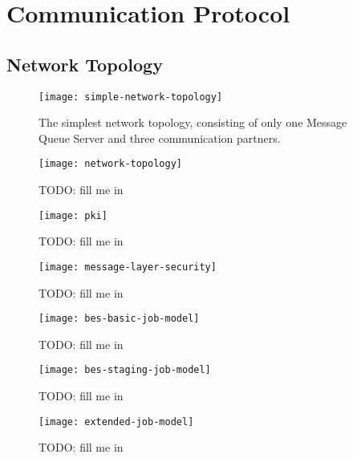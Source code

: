 \chapter{Communication Protocol}
\label{cha:comm-prot}

\section{Network Topology}
\label{sec:network-topology}

\begin{figure}[h]
  \begin{center}
    \texttt{[image: simple-network-topology]}
  \end{center}
  \caption[Network  Topology   (simple)]{The  simplest  network  topology,
    consisting of  only one Message  Queue Server and  three communication
    partners.}
  \label{fig:simple-net-top}
\end{figure}

\begin{figure}[H!]
  \begin{center}
    \texttt{[image: network-topology]}
  \end{center}
  \caption[Network  Topology]{TODO: fill me in}
  \label{fig:net-top}
\end{figure}

\begin{figure}[h]
  \begin{center}
    \texttt{[image: pki]}
  \end{center}
  \caption[Public Key Infrastructure]{TODO: fill me in}
  \label{fig:net-pki}
\end{figure}

\begin{figure}[h]
  \begin{center}
    \texttt{[image: message-layer-security]}
  \end{center}
  \caption[Message Layer Security]{TODO: fill me in}
  \label{fig:net-mls}
\end{figure}

\begin{figure}[h]
  \begin{center}
    \texttt{[image: bes-basic-job-model]}
  \end{center}
  \caption[BES Basic State Model]{TODO: fill me in}
  \label{fig:bes-basic}
\end{figure}

\begin{figure}[h]
  \begin{center}
    \texttt{[image: bes-staging-job-model]}
  \end{center}
  \caption[BES State Model Staging Extension]{TODO: fill me in}
  \label{fig:bes-staging}
\end{figure}

\begin{figure}[h]
  \begin{center}
    \texttt{[image: extended-job-model]}
  \end{center}
  \caption[Job Model (extended)]{TODO: fill me in}
  \label{fig:bes-extended}
\end{figure}

